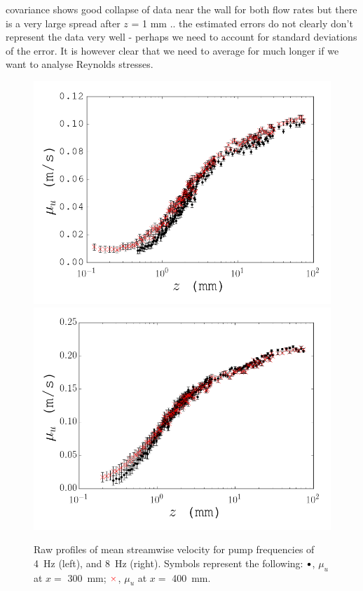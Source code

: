 \documentclass[12pt,oneside,a4paper]{article}
\begin{document}
covariance shows good collapse of data near the wall for both flow rates but there is a very large spread after $z$ = 1 mm .. the estimated errors do not clearly don't represent the data very well - perhaps we need to account for standard deviations of the error. It is however clear that we need to average for much longer if we want to analyse Reynolds stresses.



\begin{figure}[!h]
\centering
\includegraphics[width=0.5\linewidth]{images/LDA_profileImages/meanU_4hz.png}\hfill
\includegraphics[width=0.5\linewidth]{images/LDA_profileImages/meanU_8hz.png}
\caption{Raw profiles of mean streamwise velocity for pump frequencies of \SI{4}{Hz} (left), and \SI{8}{Hz} (right). Symbols represent the following: $\color{black}{\bullet}$, $\mu_u$ at $x=$ \SI{300}{mm}; $\color{red}{\times}$, $\mu_u$ at $x=$ \SI{400}{mm}.}
\label{figure:experiments:profiles:meanU}
\end{figure}
\end{document}
